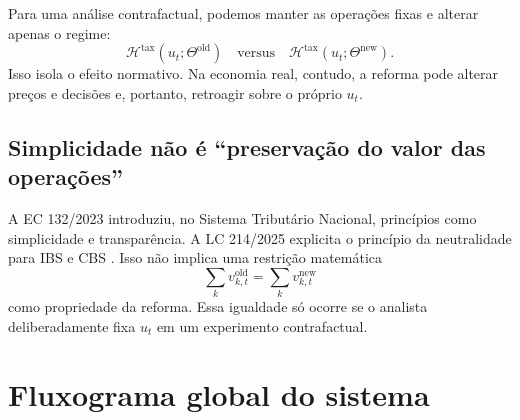 \documentclass[11pt,a4paper]{article}
\begin{document}
\begin{formalizacao}
Para uma análise contrafactual, podemos manter as operações fixas e alterar apenas o regime:
\[
\mathcal H^{\mathrm{tax}}(u_t;\Theta^{\mathrm{old}})
\quad\text{versus}\quad
\mathcal H^{\mathrm{tax}}(u_t;\Theta^{\mathrm{new}}).
\]
Isso isola o efeito normativo. Na economia real, contudo, a reforma pode alterar preços e decisões e, portanto, retroagir sobre o próprio $u_t$.
\end{formalizacao}

\subsection{Simplicidade não é ``preservação do valor das operações''}

A EC 132/2023 introduziu, no Sistema Tributário Nacional, princípios como simplicidade e transparência. A LC 214/2025 explicita o princípio da neutralidade para IBS e CBS \cite{EC132,LC214}. Isso não implica uma restrição matemática
\[
\sum_k v_{k,t}^{\mathrm{old}}=\sum_k v_{k,t}^{\mathrm{new}}
\]
como propriedade da reforma. Essa igualdade só ocorre se o analista deliberadamente fixa $u_t$ em um experimento contrafactual.

\section{Fluxograma global do sistema}
\end{document}
